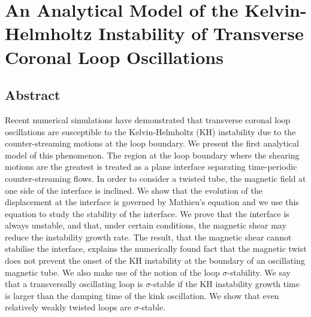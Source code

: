
\chapter{An Analytical Model of the Kelvin-Helmholtz Instability of Transverse Coronal Loop Oscillations}

\section*{Abstract}

\let\thefootnote\relax{}

Recent numerical simulations have demonstrated that transverse coronal loop oscillations are susceptible to the Kelvin-Helmholtz (KH) instability due to the counter-streaming motions at the loop boundary.
We present the first analytical model of this phenomenon.
The region at the loop boundary where the shearing motions are the greatest is treated as a plane interface separating time-periodic counter-streaming flows.
In order to consider a twisted tube, the magnetic field at one side of the interface is inclined.
We show that the evolution of the displacement at the interface is governed by Mathieu's equation and we use this equation to study the stability of the interface.
We prove that the interface is always unstable, and that, under certain conditions, the magnetic shear may reduce the instability growth rate.
The result, that the magnetic shear cannot stabilise the interface, explains the numerically found fact that the magnetic twist does not prevent the onset of the KH instability at the boundary of an oscillating magnetic tube.
We also make use of the notion of the loop $\sigma$-stability.
We say that a transversally oscillating loop is $\sigma$-stable if the KH instability growth time is larger than the damping time of the kink oscillation.
We show that even relatively weakly twisted loops are $\sigma$-stable.

